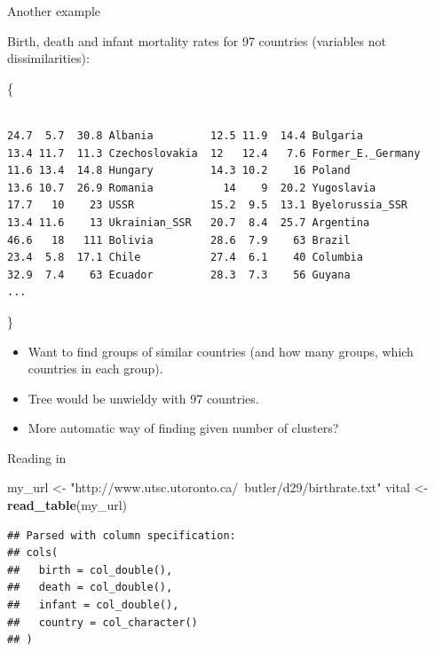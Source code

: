 \documentclass[ignorenonframetext,]{beamer}
\newenvironment{Shaded}{\begin{snugshade}}{\end{snugshade}}
\newcommand{\KeywordTok}[1]{\textcolor[rgb]{0.13,0.29,0.53}{\textbf{#1}}}
\newcommand{\NormalTok}[1]{#1}
\newcommand{\StringTok}[1]{\textcolor[rgb]{0.31,0.60,0.02}{#1}}
\begin{document}
\begin{frame}[fragile]{Another example}
\protect\hypertarget{another-example}{}

Birth, death and infant mortality rates for 97 countries (variables not
dissimilarities):

\{\scriptsize

\begin{verbatim}

24.7  5.7  30.8 Albania         12.5 11.9  14.4 Bulgaria
13.4 11.7  11.3 Czechoslovakia  12   12.4   7.6 Former_E._Germany
11.6 13.4  14.8 Hungary         14.3 10.2    16 Poland
13.6 10.7  26.9 Romania           14    9  20.2 Yugoslavia
17.7   10    23 USSR            15.2  9.5  13.1 Byelorussia_SSR
13.4 11.6    13 Ukrainian_SSR   20.7  8.4  25.7 Argentina
46.6   18   111 Bolivia         28.6  7.9    63 Brazil
23.4  5.8  17.1 Chile           27.4  6.1    40 Columbia
32.9  7.4    63 Ecuador         28.3  7.3    56 Guyana
...
\end{verbatim}

\}

\begin{itemize}
\item
  Want to find groups of similar countries (and how many groups, which
  countries in each group).
\item
  Tree would be unwieldy with 97 countries.
\item
  More automatic way of finding given number of clusters?
\end{itemize}

\end{frame}

\begin{frame}[fragile]{Reading in}
\protect\hypertarget{reading-in-2}{}

\begin{Shaded}
\begin{Highlighting}[]
\NormalTok{my_url <-}\StringTok{ "http://www.utsc.utoronto.ca/~butler/d29/birthrate.txt"}
\NormalTok{vital <-}\StringTok{ }\KeywordTok{read_table}\NormalTok{(my_url)}
\end{Highlighting}
\end{Shaded}

\begin{verbatim}
## Parsed with column specification:
## cols(
##   birth = col_double(),
##   death = col_double(),
##   infant = col_double(),
##   country = col_character()
## )
\end{verbatim}

\end{frame}
\end{document}
